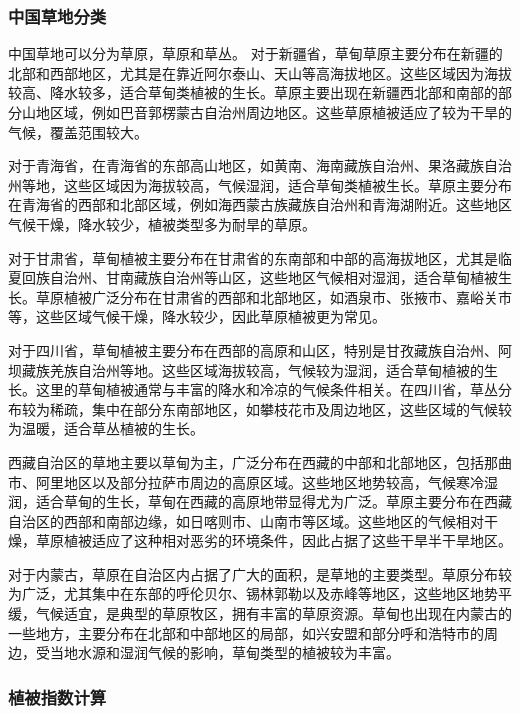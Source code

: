 \documentclass{article}
\begin{document}
	
		\subsubsection{中国草地分类}
		
		中国草地可以分为草原，草原和草丛。
	对于新疆省，草甸草原主要分布在新疆的北部和西部地区，尤其是在靠近阿尔泰山、天山等高海拔地区。这些区域因为海拔较高、降水较多，适合草甸类植被的生长。草原主要出现在新疆西北部和南部的部分山地区域，例如巴音郭楞蒙古自治州周边地区。这些草原植被适应了较为干旱的气候，覆盖范围较大。
		\par 对于青海省，在青海省的东部高山地区，如黄南、海南藏族自治州、果洛藏族自治州等地，这些区域因为海拔较高，气候湿润，适合草甸类植被生长。草原主要分布在青海省的西部和北部区域，例如海西蒙古族藏族自治州和青海湖附近。这些地区气候干燥，降水较少，植被类型多为耐旱的草原。
		\par 对于甘肃省，草甸植被主要分布在甘肃省的东南部和中部的高海拔地区，尤其是临夏回族自治州、甘南藏族自治州等山区，这些地区气候相对湿润，适合草甸植被生长。草原植被广泛分布在甘肃省的西部和北部地区，如酒泉市、张掖市、嘉峪关市等，这些区域气候干燥，降水较少，因此草原植被更为常见。
	
	
	\par 对于四川省，草甸植被主要分布在西部的高原和山区，特别是甘孜藏族自治州、阿坝藏族羌族自治州等地。这些区域海拔较高，气候较为湿润，适合草甸植被的生长。这里的草甸植被通常与丰富的降水和冷凉的气候条件相关。在四川省，草丛分布较为稀疏，集中在部分东南部地区，如攀枝花市及周边地区，这些区域的气候较为温暖，适合草丛植被的生长。
	
		\par 西藏自治区的草地主要以草甸为主，广泛分布在西藏的中部和北部地区，包括那曲市、阿里地区以及部分拉萨市周边的高原区域。这些地区地势较高，气候寒冷湿润，适合草甸的生长，草甸在西藏的高原地带显得尤为广泛。草原主要分布在西藏自治区的西部和南部边缘，如日喀则市、山南市等区域。这些地区的气候相对干燥，草原植被适应了这种相对恶劣的环境条件，因此占据了这些干旱半干旱地区。
		
		\par 对于内蒙古，草原在自治区内占据了广大的面积，是草地的主要类型。草原分布较为广泛，尤其集中在东部的呼伦贝尔、锡林郭勒以及赤峰等地区，这些地区地势平缓，气候适宜，是典型的草原牧区，拥有丰富的草原资源。草甸也出现在内蒙古的一些地方，主要分布在北部和中部地区的局部，如兴安盟和部分呼和浩特市的周边，受当地水源和湿润气候的影响，草甸类型的植被较为丰富。
		
		
		
		\subsubsection{植被指数计算}
		
\end{document}
